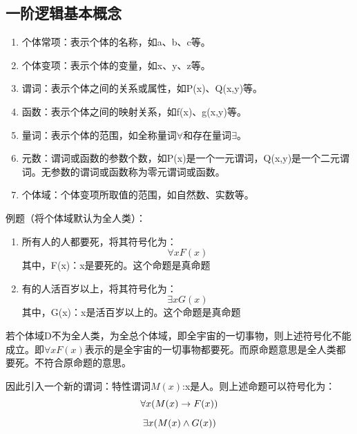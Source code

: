 \documentclass{ctexart}
\numberwithin{figure}{section}
\numberwithin{equation}{section}
\numberwithin{table}{section}
\begin{document}
    \subsection{一阶逻辑基本概念}
        \begin{enumerate}
            \item 个体常项：表示个体的名称，如a、b、c等。
            \item 个体变项：表示个体的变量，如x、y、z等。
            \item 谓词：表示个体之间的关系或属性，如P(x)、Q(x,y)等。
            \item 函数：表示个体之间的映射关系，如f(x)、g(x,y)等。
            \item 量词：表示个体的范围，如全称量词$\forall$和存在量词$\exists$。
            \item 元数：谓词或函数的参数个数，如P(x)是一个一元谓词，Q(x,y)是一个二元谓词。无参数的谓词或函数称为零元谓词或函数。
            \item 个体域：个体变项所取值的范围，如自然数、实数等。
        \end{enumerate}
        例题（将个体域默认为全人类）：
        \begin{enumerate}
            \item 所有人的人都要死，将其符号化为：
                \begin{equation}
                    \forall xF(x)
                \end{equation}
                其中，F(x)：x是要死的。这个命题是真命题
            \item 有的人活百岁以上，将其符号化为：
                \begin{equation}
                    \exists xG(x)
                \end{equation}
                其中，G(x)：x是活百岁以上的。这个命题是真命题
        \end{enumerate}

        若个体域D不为全人类，为全总个体域，即全宇宙的一切事物，则上述符号化不能成立。即$\forall xF(x)$表示的是全宇宙的一切事物都要死。而原命题意思是全人类都要死。不符合原命题的意思。

        因此引入一个新的谓词：特性谓词$M(x)$:x是人。则上述命题可以符号化为：
        \begin{equation}{\label{例题:所有人都要死}}
            \forall x(M(x)\rightarrow F(x))
        \end{equation}
        \begin{equation}{\label{例题:有的人活百岁以上}}
            \exists x(M(x)\wedge G(x))
        \end{equation}
        
\end{document}
